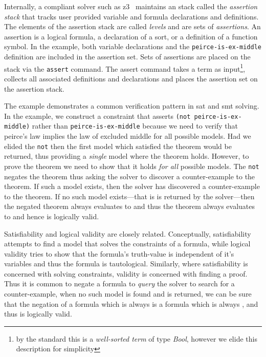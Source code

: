Internally, a compliant solver such as z3~\cite{10.1007/978-3-540-78800-3_24}
maintains an stack called the \emph{assertion stack} that tracks user provided
variable and formula declarations and definitions. The elements of the assertion
stack are called \emph{levels} and are sets of \emph{assertions}.
%
An assertion is a logical formula, a declaration of a sort, or a definition of a
function symbol. In the example, both variable declarations and the
\lstinline{peirce-is-ex-middle} definition are included in the assertion set.
Sets of assertions are placed on the stack via the \lstinline{assert} command.
The assert command takes a term as input\footnote{by the standard this is a
  \emph{well-sorted term} of type \emph{Bool}, however we elide this description
  for simplicity}, collects all associated definitions and declarations and
places the assertion set on the assertion stack.

The example demonstrates a common verification pattern in \ac{sat} and \ac{smt}
solving. In the example, we construct a constraint that asserts
\lstinline{(not peirce-is-ex-middle)} rather than
\lstinline{peirce-is-ex-middle} because we need to verify that peirce's law
implies the law of excluded middle for all possible models. Had we elided the
\lstinline{not} then the first model which satisfied the theorem would be
returned, thus providing a \emph{single} model where the theorem holds. However,
to prove the theorem we need to show that it holds \emph{for all} possible
models. The \lstinline{not} negates the theorem thus asking the solver to
discover a counter-example to the theorem. If such a model exists, then the
solver has discovered a counter-example to the theorem. If no such model
exists---that is  is returned by the solver---then the negated theorem
always evaluates to \fls{} and thus the theorem always evaluates to \tru{} and
hence is logically valid.

Satisfiability and logical validity are closely related. Conceptually,
satisfiability attempts to find a model that solves the constraints of a
formula, while logical validity tries to show that the formula's truth-value is
independent of it's variables and thus the formula is tautological. Similarly,
where satisfiability is concerned with solving constraints, validity is
concerned with finding a proof. Thus it is common to negate a formula to
\emph{query} the solver to search for a counter-example, when no such model is
found and  is returned, we can be sure that the negation of a formula
which is always \fls{} is a formula which is always \tru{}, and thus is
logically valid.

